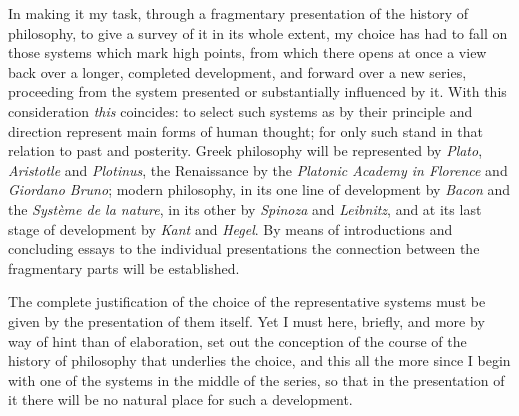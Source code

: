 \documentclass[12pt,a4paper,openany]{book}
\newcommand{\opage}[1]{\marginnote{\footnotesize\textit{[#1]}}}
\begin{document}
In making it my task, through a fragmentary presentation of the history
of philosophy, to give a survey of it in its whole extent, my choice has
had to fall on those systems which mark high points, from which there
opens at once a view back over a longer, completed development, and
forward over a new series, proceeding from the system presented or
substantially influenced by it. With this consideration \emph{this}
coincides: to select such systems as by their principle and direction
represent main forms of human thought; for only such stand in that
relation to past and posterity. Greek philosophy will be represented by
\emph{Plato}, \emph{Aristotle} and \emph{Plotinus}, the Renaissance by the
\emph{Platonic Academy in Florence} and \emph{Giordano Bruno}; modern
philosophy, in its one line of development by \emph{Bacon} and the
\emph{Système de la nature}, in its other by \emph{Spinoza} and
\emph{Leibnitz}, and at its last stage of development by \emph{Kant}
and \emph{Hegel}. By means of introductions and
\opage{3}concluding essays to the
individual presentations the connection between the fragmentary parts
will be established.

The complete justification of the choice of the representative systems
must be given by the presentation of them itself. Yet I must here,
briefly, and more by way of hint than of elaboration, set out the
conception of the course of the history of philosophy that underlies the
choice, and this all the more since I begin with one of the systems in
the middle of the series, so that in the presentation of it there will
be no natural place for such a development.
\end{document}

